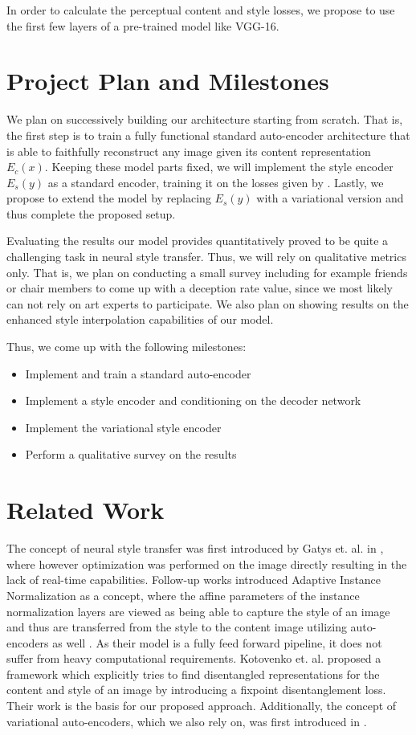\documentclass[twoside,twocolumn]{article}
\begin{document}
In order to calculate the perceptual content and style losses, we propose to use the first few layers of a pre-trained model like VGG-16.

\section{Project Plan and Milestones}

We plan on successively building our architecture starting from scratch. That is, the first step is to train a fully functional standard auto-encoder architecture that is able to faithfully reconstruct any image given its content representation $E_c(x)$. Keeping these model parts fixed, we will implement the style encoder $E_s(y)$ as a standard encoder, training it on the losses given by \cite{Kotovenko_2019_ICCV}. Lastly, we propose to extend the model by replacing $E_s(y)$ with a variational version and thus complete the proposed setup.

Evaluating the results our model provides quantitatively proved to be quite a challenging task in neural style transfer. Thus, we will rely on qualitative metrics only. That is, we plan on conducting a small survey including for example friends or chair members to come up with a deception rate value, since we most likely can not rely on art experts to  participate. We also plan on showing results on the enhanced style interpolation capabilities of our model.

Thus, we come up with the following milestones:
\begin{itemize}
	\item Implement and train a standard auto-encoder
	\item Implement a style encoder and conditioning on the decoder network
	\item Implement the variational style encoder
	\item Perform a qualitative survey on the results
\end{itemize}

\section{Related Work}

The concept of neural style transfer was first introduced by Gatys et. al. in \cite{gatys}, where however optimization was performed on the image directly resulting in the lack of real-time capabilities. Follow-up works introduced Adaptive Instance Normalization as a concept, where the affine parameters of the instance normalization layers are viewed as being able to capture the style of an image and thus are transferred from the style to the content image utilizing auto-encoders as well \cite{adain}. As their model is a fully feed forward pipeline, it does not suffer from heavy computational requirements. Kotovenko et. al. proposed a framework which explicitly tries to find disentangled representations for the content and style of an image by introducing a fixpoint disentanglement loss. Their work \cite{Kotovenko_2019_ICCV} is the basis for our proposed approach. Additionally, the concept of variational auto-encoders, which we also rely on, was first introduced in \cite{vae}.

\printbibliography
\end{document}
